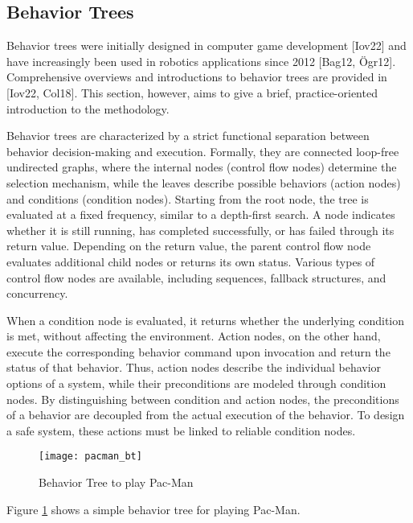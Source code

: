 \subsection{Behavior Trees}

Behavior trees were initially designed in computer game development [Iov22] and have increasingly been used in robotics applications since 2012 [Bag12, Ögr12].
Comprehensive overviews and introductions to behavior trees are provided in [Iov22, Col18].
This section, however, aims to give a brief, practice-oriented introduction to the methodology.

Behavior trees are characterized by a strict functional separation between behavior decision-making and execution.
Formally, they are connected loop-free undirected graphs, where the internal nodes (control flow nodes) determine the selection mechanism, while the leaves describe possible behaviors (action nodes) and conditions (condition nodes).
Starting from the root node, the tree is evaluated at a fixed frequency, similar to a depth-first search.
A node indicates whether it is still running, has completed successfully, or has failed through its return value.
Depending on the return value, the parent control flow node evaluates additional child nodes or returns its own status.
Various types of control flow nodes are available, including sequences, fallback structures, and concurrency.

When a condition node is evaluated, it returns whether the underlying condition is met, without affecting the environment.
Action nodes, on the other hand, execute the corresponding behavior command upon invocation and return the status of that behavior.
Thus, action nodes describe the individual behavior options of a system, while their preconditions are modeled through condition nodes.
By distinguishing between condition and action nodes, the preconditions of a behavior are decoupled from the actual execution of the behavior.
To design a safe system, these actions must be linked to reliable condition nodes.

\begin{figure}
  \centering
  \texttt{[image: pacman\_bt]}

  \caption{Behavior Tree to play Pac-Man}%
  \label{fig:pacman_bt}
\end{figure}

Figure \ref{fig:pacman_bt} shows a simple behavior tree for playing Pac-Man.


